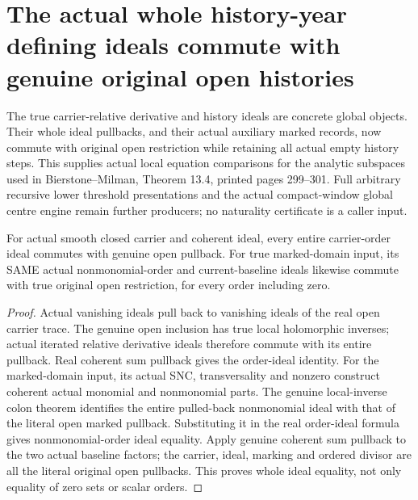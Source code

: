 \section{The actual whole history-year defining ideals commute with genuine original open histories}

The true carrier-relative derivative and history ideals are concrete global
objects. Their whole ideal pullbacks, and their actual auxiliary marked records,
now commute with original open restriction while retaining all actual empty
history steps. This supplies actual local equation comparisons for the analytic
subspaces used in Bierstone--Milman\cite{bierstone-milman97-invent-math},
Theorem 13.4, printed pages 299--301. Full arbitrary recursive lower threshold
presentations and the actual compact-window global centre engine remain further
producers; no naturality certificate is a caller input.

\begin{theorem}
\label{hir:original-coherent-history-carrier-baseline-open-pullback}
\leanok
{}
For actual smooth closed carrier and coherent ideal, every entire carrier-order
ideal commutes with genuine open pullback. For true marked-domain input, its
SAME actual nonmonomial-order and current-baseline ideals likewise commute
with true original open restriction, for every order including zero.
\end{theorem}
\begin{proof}
Actual vanishing ideals pull back to vanishing ideals of the real open carrier
trace. The genuine open inclusion has true local holomorphic inverses; actual
iterated relative derivative ideals therefore commute with its entire pullback.
Real coherent sum pullback gives the order-ideal identity. For the marked-domain
input, its actual SNC, transversality and nonzero construct coherent actual
monomial and nonmonomial parts. The genuine local-inverse colon theorem
identifies the entire pulled-back nonmonomial ideal with that of the literal
open marked pullback. Substituting it in the real order-ideal formula gives
nonmonomial-order ideal equality. Apply genuine coherent sum pullback to the
two actual baseline factors; the carrier, ideal, marking and ordered divisor
are all the literal original open pullbacks. This proves whole ideal equality,
not only equality of zero sets or scalar orders.
\end{proof}

